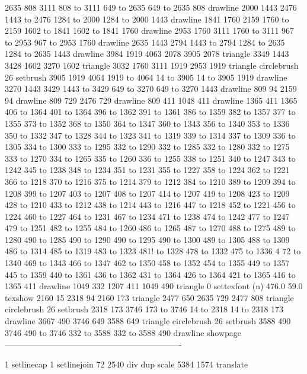 2635 808 3111 808 to 3111 649 to 2635 649 to 2635 808 drawline
2000 1443 2476 1443 to 2476 1284 to 2000 1284 to 2000 1443 drawline
1841 1760 2159 1760 to 2159 1602 to 1841 1602 to 1841 1760 drawline
2953 1760 3111 1760 to 3111 967 to 2953 967 to 2953 1760 drawline
2635 1443 2794 1443 to 2794 1284 to 2635 1284 to 2635 1443 drawline
3984 1919 4063 2078 3905 2078 triangle
3349 1443 3428 1602 3270 1602 triangle
3032 1760 3111 1919 2953 1919 triangle
circlebrush 26 setbrush
3905 1919 4064 1919 to 4064 14 to 3905 14 to 3905 1919 drawline
3270 1443 3429 1443 to 3429 649 to 3270 649 to 3270 1443 drawline
809 94 2159 94 drawline
809 729 2476 729 drawline
809 411 1048 411 drawline
1365 411 1365 406 to 1364 401 to 1364 396 to 1362 391 to 1361 386 to 1359 382 to 1357 377 to 1355 373 to 1352 368 to 1350 364 to 1347 360 to 1343 356 to 1340 353 to 1336 350 to 1332 347 to 1328 344 to 1323 341 to 1319 339 to 1314 337 to 1309 336 to 1305 334 to 1300 333 to 1295 332 to 1290 332 to 1285 332 to 1280 332 to 1275 333 to 1270 334 to 1265 335 to 1260 336 to 1255 338 to 1251 340 to 1247 343 to 1242 345 to 1238 348 to 1234 351 to 1231 355 to 1227 358 to 1224 362 to 1221 366 to 1218 370 to 1216 375 to 1214 379 to 1212 384 to 1210 389 to 1209 394 to 1208 399 to 1207 403 to 1207 408 to 1207 414 to 1207 419 to 1208 423 to 1209 428 to 1210 433 to 1212 438 to 1214 443 to 1216 447 to 1218 452 to 1221 456 to 1224 460 to 1227 464 to 1231 467 to 1234 471 to 1238 474 to 1242 477 to 1247 479 to 1251 482 to 1255 484 to 1260 486 to 1265 487 to 1270 488 to 1275 489 to 1280 490 to 1285 490 to 1290 490 to 1295 490 to 1300 489 to 1305 488 to 1309 486 to 1314 485 to 1319 483 to 1323 481!
 to 1328 478 to 1332 475 to 1336 4
72 to 1340 469 to 1343 466 to 1347 462 to 1350 458 to 1352 454 to 1355 449 to 1357 445 to 1359 440 to 1361 436 to 1362 431 to 1364 426 to 1364 421 to 1365 416 to 1365 411 drawline
1049 332 1207 411 1049 490 triangle
0 settexfont
(n) 476.0 59.0 texshow
2160 15 2318 94 2160 173 triangle
2477 650 2635 729 2477 808 triangle
circlebrush 26 setbrush
2318 173 3746 173 to 3746 14 to 2318 14 to 2318 173 drawline
3667 490 3746 649 3588 649 triangle
circlebrush 26 setbrush
3588 490 3746 490 to 3746 332 to 3588 332 to 3588 490 drawline
showpage
----------------------------------------------------------------

1 setlinecap 1 setlinejoin
72 2540 div dup scale
5384 1574 translate


